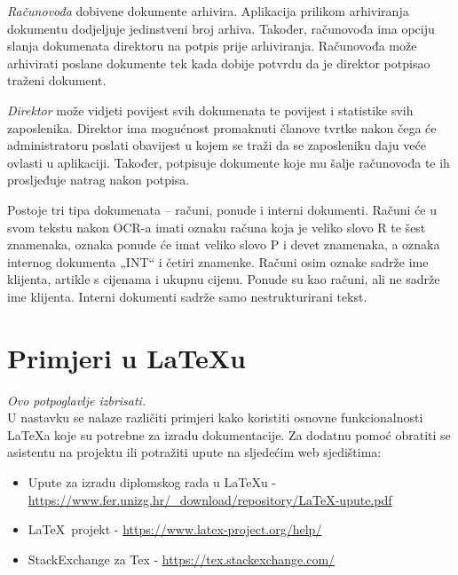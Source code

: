 		\textit{Računovođa} dobivene dokumente arhivira. Aplikacija prilikom arhiviranja	dokumentu dodjeljuje jedinstveni broj arhiva. Također, računovođa ima opciju slanja dokumenata direktoru na potpis prije arhiviranja. Računovođa može arhivirati poslane dokumente tek kada dobije potvrdu da je direktor potpisao traženi dokument.
		
		\textit {Direktor} može vidjeti povijest svih dokumenata te povijest i	statistike svih zaposlenika. Direktor ima mogućnost promaknuti članove tvrtke nakon čega će administratoru poslati obavijest u kojem se traži da se zaposleniku daju veće ovlasti u aplikaciji. Također, potpisuje dokumente koje mu šalje računovođa te ih prosljeđuje natrag nakon potpisa.
		
		Postoje tri tipa dokumenata – računi, ponude i interni dokumenti. Računi će u
		svom tekstu nakon OCR-a imati oznaku računa koja je veliko slovo R te šest znamenaka, oznaka ponude će imat veliko slovo P i devet znamenaka, a oznaka internog dokumenta
		„INT“ i četiri znamenke. Računi osim oznake sadrže ime klijenta, artikle s cijenama i
		ukupnu cijenu. Ponude su kao računi, ali ne sadrže ime klijenta. Interni dokumenti
		sadrže samo nestrukturirani tekst.\\
		
		\eject
		
		\section{Primjeri u \LaTeX u}
		
		\textit{Ovo potpoglavlje izbrisati.}\\

		U nastavku se nalaze različiti primjeri kako koristiti osnovne funkcionalnosti \LaTeX a koje su potrebne za izradu dokumentacije. Za dodatnu pomoć obratiti se asistentu na projektu ili potražiti upute na sljedećim web sjedištima:
		\begin{itemize}
			\item Upute za izradu diplomskog rada u \LaTeX u - \url{https://www.fer.unizg.hr/_download/repository/LaTeX-upute.pdf}
			\item \LaTeX\ projekt - \url{https://www.latex-project.org/help/}
			\item StackExchange za Tex - \url{https://tex.stackexchange.com/}\\
		
		\end{itemize} 	



